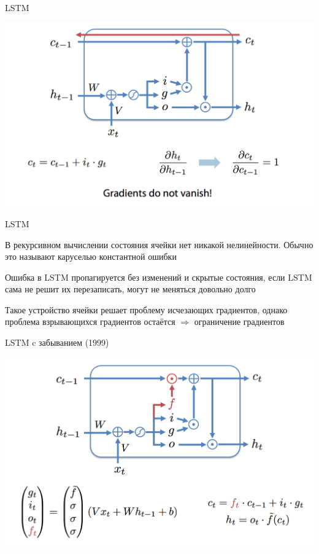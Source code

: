 \documentclass[notes,12pt, aspectratio=169]{beamer}
\newenvironment{wideitemize}{\itemize\addtolength{\itemsep}{10pt}}{\enditemize}
\begin{document}
\begin{frame}{LSTM}
\begin{center}
	\includegraphics[width=.8\linewidth]{lstm7.png}
\end{center}
\end{frame}


\begin{frame}{LSTM}
\begin{wideitemize}
	\item  В рекурсивном вычислении состояния ячейки нет никакой нелинейности. Обычно это называют \alert{каруселью константной ошибки} 
	
	\item Ошибка в LSTM пропагируется без изменений и скрытые состояния, если LSTM сама не решит их перезаписать, могут не меняться довольно долго
	
	\item Такое устройство ячейки решает проблему исчезающих градиентов, однако проблема взрывающихся градиентов остаётся \alert{$\Rightarrow$ ограничение градиентов}
\end{wideitemize}
\end{frame}


\begin{frame}{LSTM c забыванием (1999)}
\begin{center}
	\includegraphics[width=.8\linewidth]{lstm8.png}
\end{center}
\end{frame}
\end{document}
